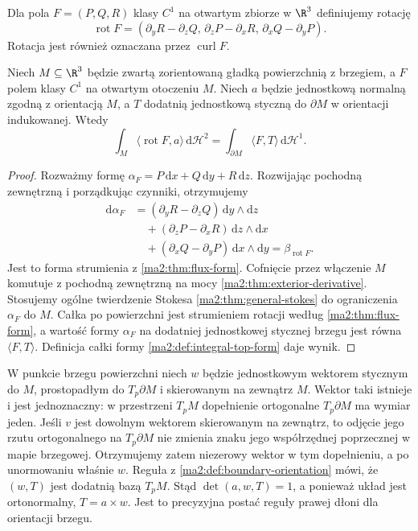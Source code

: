 Dla pola $F=(P,Q,R)$ klasy $C^1$ na otwartym
zbiorze w $\R^3$ definiujemy rotację
\[
 \operatorname{rot}F=
 (\partial_y R-\partial_z Q,\,
  \partial_z P-\partial_x R,\,
  \partial_x Q-\partial_y P).
\]
Rotacja jest również oznaczana przez
$\operatorname{curl}F$.

\begin{twierdzenie}
\label{ma2:thm:classical-stokes}
Niech $M\subseteq\R^3$ będzie zwartą zorientowaną
gładką powierzchnią z brzegiem, a $F$ polem
klasy $C^1$ na otwartym otoczeniu $M$.
Niech $a$ będzie jednostkową normalną zgodną
z orientacją $M$, a $T$ dodatnią jednostkową
styczną do $\partial M$ w orientacji indukowanej.
Wtedy
\[
 \boxed{\displaystyle
 \int_M\langle\operatorname{rot}F,a\rangle
 \,\mathrm d\mathcal H^2
 =\int_{\partial M}\langle F,T\rangle
 \,\mathrm d\mathcal H^1.}
\]
\end{twierdzenie}
\begin{proof}
Rozważmy formę $\alpha_F=P\,\mathrm dx+
Q\,\mathrm dy+R\,\mathrm dz$.
Rozwijając pochodną zewnętrzną i porządkując
czynniki, otrzymujemy
\[
 \begin{aligned}
 \mathrm d\alpha_F
 &=(\partial_y R-\partial_z Q)\,\mathrm dy\wedge\mathrm dz\\
 &\quad+(\partial_z P-\partial_x R)\,\mathrm dz\wedge\mathrm dx\\
 &\quad+(\partial_x Q-\partial_y P)\,\mathrm dx\wedge\mathrm dy
 =\beta_{\operatorname{rot}F}.
 \end{aligned}
\]
Jest to forma strumienia z \ref{ma2:thm:flux-form}.
Cofnięcie przez włączenie $M$ komutuje
z pochodną zewnętrzną na mocy
\ref{ma2:thm:exterior-derivative}.
Stosujemy ogólne twierdzenie Stokesa
\ref{ma2:thm:general-stokes} do ograniczenia
$\alpha_F$ do $M$.
Całka po powierzchni jest strumieniem rotacji
według \ref{ma2:thm:flux-form},
a wartość formy $\alpha_F$ na dodatniej
jednostkowej stycznej brzegu jest równa
$\langle F,T\rangle$. Definicja całki formy
\ref{ma2:def:integral-top-form} daje wynik.
\end{proof}

W punkcie brzegu powierzchni niech $w$ będzie
jednostkowym wektorem stycznym do $M$,
prostopadłym do $T_p\partial M$ i skierowanym
na zewnątrz $M$. Wektor taki istnieje i jest
jednoznaczny: w przestrzeni $T_pM$ dopełnienie
ortogonalne $T_p\partial M$ ma wymiar jeden.
Jeśli $v$ jest dowolnym wektorem skierowanym
na zewnątrz, to odjęcie jego rzutu ortogonalnego
na $T_p\partial M$ nie zmienia znaku jego
współrzędnej poprzecznej w mapie brzegowej.
Otrzymujemy zatem niezerowy wektor w tym
dopełnieniu, a po unormowaniu właśnie $w$.
Reguła z
\ref{ma2:def:boundary-orientation} mówi,
że $(w,T)$ jest dodatnią bazą $T_pM$.
Stąd $\det(a,w,T)=1$, a ponieważ układ
jest ortonormalny, $T=a\times w$.
Jest to precyzyjna postać reguły prawej dłoni
dla orientacji brzegu.

